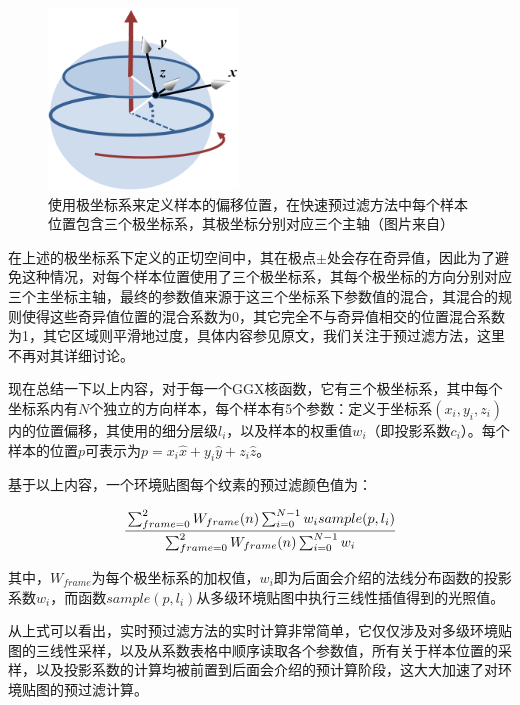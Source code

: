 \begin{figure}
	\sidecaption
	\includegraphics[width=0.45\textwidth]{figures/pl/polar-frame}
	\caption{使用极坐标系来定义样本的偏移位置，在快速预过滤方法中每个样本位置包含三个极坐标系，其极坐标分别对应三个主轴（图片来自\cite{a:FastFilteringofReflectionProbes}）}
	\label{f:pl-polar-frame}
\end{figure}

在上述的极坐标系下定义的正切空间中，其在极点$\pm$处会存在奇异值，因此为了避免这种情况，\cite{a:FastFilteringofReflectionProbes}对每个样本位置使用了三个极坐标系，其每个极坐标的方向分别对应三个主坐标主轴，最终的参数值来源于这三个坐标系下参数值的混合，其混合的规则使得这些奇异值位置的混合系数为0，其它完全不与奇异值相交的位置混合系数为1，其它区域则平滑地过度，具体内容参见原文，我们关注于预过滤方法，这里不再对其详细讨论。

现在总结一下以上内容，对于每一个GGX核函数，它有三个极坐标系，其中每个坐标系内有$N$个独立的方向样本，每个样本有5个参数：定义于坐标系$(x_i,y_i,z_i)$内的位置偏移，其使用的细分层级$l_i$，以及样本的权重值$w_i$（即投影系数$c_i$）。每个样本的位置$p$可表示为$p=x_i\hat{x}+y_i\hat{y}+z_i\hat{z}$。

基于以上内容，一个环境贴图每个纹素的预过滤颜色值为：

\begin{equation}
	\cfrac{\sum^{2}_{frame=0}W_{frame}(n)\sum^{N-1}_{i=0}w_i sample(p,l_i)}{\sum^{2}_{frame=0}W_{frame}(n)\sum^{N-1}_{i=0}w_i}
\end{equation}

\noindent 其中，$W_{frame}$为每个极坐标系的加权值，$w_i$即为后面会介绍的法线分布函数的投影系数$w_i$，而函数$sample(p,l_i)$从多级环境贴图中执行三线性插值得到的光照值。

从上式可以看出，实时预过滤方法的实时计算非常简单，它仅仅涉及对多级环境贴图的三线性采样，以及从系数表格中顺序读取各个参数值，所有关于样本位置的采样，以及投影系数的计算均被前置到后面会介绍的预计算阶段，这大大加速了对环境贴图的预过滤计算。

